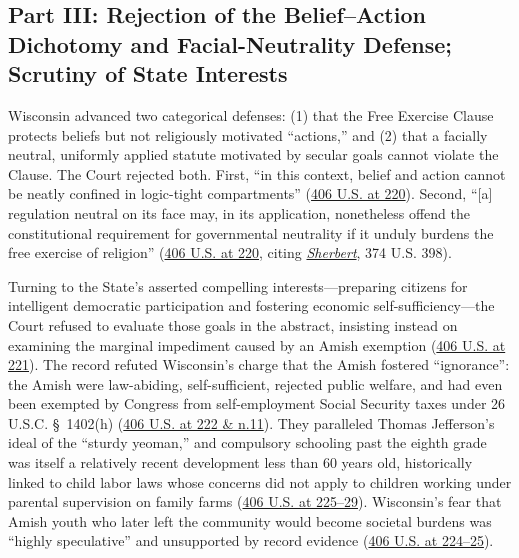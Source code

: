 \documentclass[12pt]{article}
\begin{document}
\subsection{Part III: Rejection of the Belief--Action Dichotomy and Facial-Neutrality Defense; Scrutiny of State Interests}

Wisconsin advanced two categorical defenses: (1) that the Free Exercise Clause protects beliefs but not religiously motivated ``actions,'' and (2) that a facially neutral, uniformly applied statute motivated by secular goals cannot violate the Clause. The Court rejected both. First, ``in this context, belief and action cannot be neatly confined in logic-tight compartments'' (\href{https://supreme.justia.com/cases/federal/us/406/205/}{406 U.S. at 220}). Second, ``[a] regulation neutral on its face may, in its application, nonetheless offend the constitutional requirement for governmental neutrality if it unduly burdens the free exercise of religion'' (\href{https://supreme.justia.com/cases/federal/us/406/205/}{406 U.S. at 220}, citing \href{https://supreme.justia.com/cases/federal/us/374/398/}{\emph{Sherbert}}, 374 U.S. 398).

Turning to the State's asserted compelling interests---preparing citizens for intelligent democratic participation and fostering economic self-sufficiency---the Court refused to evaluate those goals in the abstract, insisting instead on examining the marginal impediment caused by an Amish exemption (\href{https://supreme.justia.com/cases/federal/us/406/205/}{406 U.S. at 221}). The record refuted Wisconsin's charge that the Amish fostered ``ignorance'': the Amish were law-abiding, self-sufficient, rejected public welfare, and had even been exempted by Congress from self-employment Social Security taxes under 26 U.S.C. \S~1402(h) (\href{https://supreme.justia.com/cases/federal/us/406/205/}{406 U.S. at 222 \& n.11}). They paralleled Thomas Jefferson's ideal of the ``sturdy yeoman,'' and compulsory schooling past the eighth grade was itself a relatively recent development less than 60 years old, historically linked to child labor laws whose concerns did not apply to children working under parental supervision on family farms (\href{https://supreme.justia.com/cases/federal/us/406/205/}{406 U.S. at 225--29}). Wisconsin's fear that Amish youth who later left the community would become societal burdens was ``highly speculative'' and unsupported by record evidence (\href{https://supreme.justia.com/cases/federal/us/406/205/}{406 U.S. at 224--25}).
\end{document}
